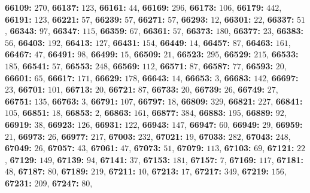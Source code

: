 \textsf{\bfseries 66109:} $270$, \textsf{\bfseries 66137:} $123$, \textsf{\bfseries 66161:} $44$, \textsf{\bfseries 66169:} $296$, \textsf{\bfseries 66173:} $106$, \textsf{\bfseries 66179:} $442$, \textsf{\bfseries 66191:} $123$, \textsf{\bfseries 66221:} $57$, \textsf{\bfseries 66239:} $57$, \textsf{\bfseries 66271:} $57$, \textsf{\bfseries 66293:} $12$, \textsf{\bfseries 66301:} $22$, \textsf{\bfseries 66337:} $51$, \textsf{\bfseries 66343:} $97$, \textsf{\bfseries 66347:} $115$, \textsf{\bfseries 66359:} $67$, \textsf{\bfseries 66361:} $57$, \textsf{\bfseries 66373:} $180$, \textsf{\bfseries 66377:} $23$, \textsf{\bfseries 66383:} $56$, \textsf{\bfseries 66403:} $192$, \textsf{\bfseries 66413:} $127$, \textsf{\bfseries 66431:} $154$, \textsf{\bfseries 66449:} $14$, \textsf{\bfseries 66457:} $87$, \textsf{\bfseries 66463:} $161$, \textsf{\bfseries 66467:} $47$, \textsf{\bfseries 66491:} $98$, \textsf{\bfseries 66499:} $15$, \textsf{\bfseries 66509:} $21$, \textsf{\bfseries 66523:} $295$, \textsf{\bfseries 66529:} $215$, \textsf{\bfseries 66533:} $185$, \textsf{\bfseries 66541:} $57$, \textsf{\bfseries 66553:} $248$, \textsf{\bfseries 66569:} $112$, \textsf{\bfseries 66571:} $87$, \textsf{\bfseries 66587:} $77$, \textsf{\bfseries 66593:} $20$, \textsf{\bfseries 66601:} $65$, \textsf{\bfseries 66617:} $171$, \textsf{\bfseries 66629:} $178$, \textsf{\bfseries 66643:} $14$, \textsf{\bfseries 66653:} $3$, \textsf{\bfseries 66683:} $142$, \textsf{\bfseries 66697:} $23$, \textsf{\bfseries 66701:} $101$, \textsf{\bfseries 66713:} $20$, \textsf{\bfseries 66721:} $87$, \textsf{\bfseries 66733:} $20$, \textsf{\bfseries 66739:} $26$, \textsf{\bfseries 66749:} $27$, \textsf{\bfseries 66751:} $135$, \textsf{\bfseries 66763:} $3$, \textsf{\bfseries 66791:} $107$, \textsf{\bfseries 66797:} $18$, \textsf{\bfseries 66809:} $329$, \textsf{\bfseries 66821:} $227$, \textsf{\bfseries 66841:} $105$, \textsf{\bfseries 66851:} $18$, \textsf{\bfseries 66853:} $2$, \textsf{\bfseries 66863:} $161$, \textsf{\bfseries 66877:} $384$, \textsf{\bfseries 66883:} $195$, \textsf{\bfseries 66889:} $92$, \textsf{\bfseries 66919:} $38$, \textsf{\bfseries 66923:} $126$, \textsf{\bfseries 66931:} $122$, \textsf{\bfseries 66943:} $147$, \textsf{\bfseries 66947:} $60$, \textsf{\bfseries 66949:} $29$, \textsf{\bfseries 66959:} $21$, \textsf{\bfseries 66973:} $26$, \textsf{\bfseries 66977:} $217$, \textsf{\bfseries 67003:} $232$, \textsf{\bfseries 67021:} $19$, \textsf{\bfseries 67033:} $282$, \textsf{\bfseries 67043:} $248$, \textsf{\bfseries 67049:} $26$, \textsf{\bfseries 67057:} $43$, \textsf{\bfseries 67061:} $47$, \textsf{\bfseries 67073:} $51$, \textsf{\bfseries 67079:} $113$, \textsf{\bfseries 67103:} $69$, \textsf{\bfseries 67121:} $22$, \textsf{\bfseries 67129:} $149$, \textsf{\bfseries 67139:} $94$, \textsf{\bfseries 67141:} $37$, \textsf{\bfseries 67153:} $181$, \textsf{\bfseries 67157:} $7$, \textsf{\bfseries 67169:} $117$, \textsf{\bfseries 67181:} $48$, \textsf{\bfseries 67187:} $80$, \textsf{\bfseries 67189:} $219$, \textsf{\bfseries 67211:} $10$, \textsf{\bfseries 67213:} $17$, \textsf{\bfseries 67217:} $349$, \textsf{\bfseries 67219:} $156$, \textsf{\bfseries 67231:} $209$, \textsf{\bfseries 67247:} $80$, 
